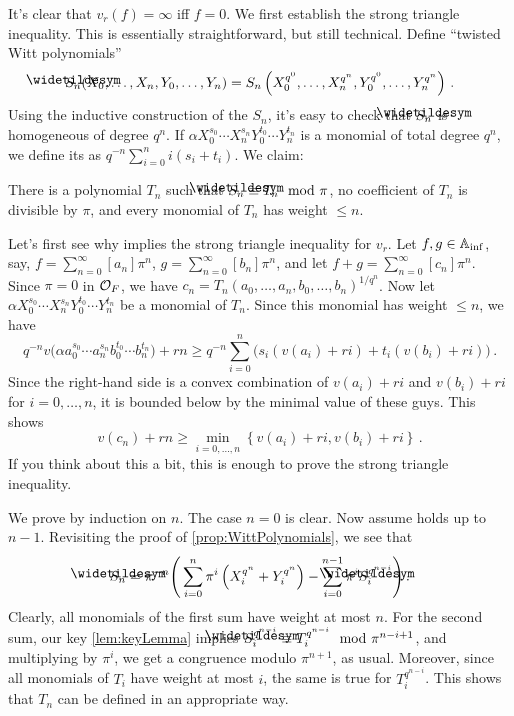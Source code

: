 \begin{proof*}
	It's clear that $v_r(f)=\infty$ iff $f=0$. We first establish the strong triangle inequality. This is essentially straightforward, but still technical. Define \enquote{twisted Witt polynomials}
	\begin{equation*}
		\snake{S}_n(X_0,\dotsc,X_n,Y_0,\dotsc,Y_n)=S_n\left(X_0^{q^0},\dotsc,X_n^{q^n},Y_0^{q^0},\dotsc,Y_n^{q^n}\right)\,.
	\end{equation*}
	Using the inductive construction of the $S_n$, it's easy to check that $\snake{S}_n$ is homogeneous of degree $q^n$. If $\alpha X_0^{s_0}\dotsm X_n^{s_n}Y_0^{t_0}\dotsm Y_n^{t_n}$ is a monomial of total degree $q^n$, we define its  as $q^{-n}\sum_{i=0}^ni(s_i+t_i)$. We claim:
	\begin{alphanumerate}
		\item[\itememph{*}] There is a polynomial $T_n$ such that $\snake{S}_n\equiv T_n\mod \pi$, no coefficient of $T_n$ is divisible by $\pi$, and every monomial of $T_n$ has weight $\leq n$.
	\end{alphanumerate}
	Let's first see why \itememph{*} implies the strong triangle inequality for $v_r$. Let $f,g\in \mathbb{A}_{\mathrm{inf}}$, say, $f=\sum_{n=0}^\infty [a_n]\pi^n$, $g=\sum_{n=0}^\infty [b_n]\pi^n$, and let $f+g=\sum_{n=0}^\infty[c_n]\pi^n$. Since $\pi=0$ in $\mathcal{O}_F$, we have $c_n=T_n(a_0,\dotsc,a_n,b_0,\dotsc,b_n)^{1/q^n}$. Now let $\alpha X_0^{s_0}\dotsm X_n^{s_n}Y_0^{t_0}\dotsm Y_n^{t_n}$ be a monomial of $T_n$. Since this monomial has weight $\leq n$, we have
	\begin{equation*}
		q^{-n}v\big(\alpha a_0^{s_0}\dotsm a_n^{s_n}b_0^{t_0}\dotsm b_n^{t_n}\big)+rn\geq q^{-n}\sum_{i=0}^n\big(s_i(v(a_i)+ri)+t_i(v(b_i)+ri)\big)\,.
	\end{equation*}
	Since the right-hand side is a convex combination of $v(a_i)+ri$ and $v(b_i)+ri$ for $i=0,\dotsc,n$, it is bounded below by the minimal value of these guys. This shows
	\begin{equation*}
		v(c_n)+rn\geq \min_{i=0,\dotsc,n}\left\{v(a_i)+ri,v(b_i)+ri\right\}\,.
	\end{equation*}
	If you think about this a bit, this is enough to prove the strong triangle inequality.
	
	We prove \itememph{*} by induction on $n$. The case $n=0$ is clear. Now assume \itememph{*} holds up to $n-1$. Revisiting the proof of \cref{prop:WittPolynomials}, we see that
	\begin{equation*}
		\snake{S}_n=\pi^{-n}\Bigg(\sum_{i=0}^n\pi^i\left(X_i^{q^n}+Y_i^{q^n}\right)-\sum_{i=0}^{n-1}\pi^i\snake{S}_i^{q^{n-i}}\Bigg)\,.
	\end{equation*}
	Clearly, all monomials of the first sum have weight at most $n$. For the second sum, our key \cref{lem:keyLemma} implies $\snake{S}_i^{q^{n-i}}\equiv T_i^{q^{n-i}}\mod\pi^{n-i+1}$, and multiplying by $\pi^i$, we get a congruence modulo $\pi^{n+1}$, as usual. Moreover, since all monomials of $T_i$ have weight at most $i$, the same is true for $T_i^{q^{n-i}}$. This shows that $T_n$ can be defined in an appropriate way.
	

\end{proof*}
